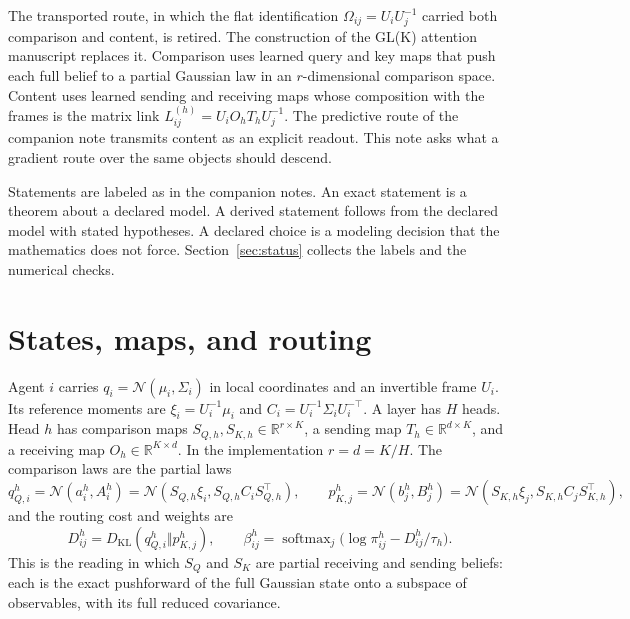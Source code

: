 \documentclass[11pt]{article}
\theoremstyle{definition}
\theoremstyle{remark}
\newcommand{\KL}{D_{\mathrm{KL}}}
\newcommand{\softmax}{\operatorname{softmax}}
\newcommand{\N}{\mathcal{N}}
\begin{document}
The transported route, in which the flat identification $\Omega_{ij}=U_iU_j^{-1}$ carried both comparison and content, is retired. The construction of the GL(K) attention manuscript \citep{dennis2026glk} replaces it. Comparison uses learned query and key maps that push each full belief to a partial Gaussian law in an $r$-dimensional comparison space. Content uses learned sending and receiving maps whose composition with the frames is the matrix link $L_{ij}^{(h)}=U_iO_hT_hU_j^{-1}$. The predictive route of the companion note \citep{dennis2026predictive} transmits content as an explicit readout. This note asks what a gradient route over the same objects should descend.

Statements are labeled as in the companion notes. An exact statement is a theorem about a declared model. A derived statement follows from the declared model with stated hypotheses. A declared choice is a modeling decision that the mathematics does not force. Section~\ref{sec:status} collects the labels and the numerical checks.

\section{States, maps, and routing}
\label{sec:setup}

Agent $i$ carries $q_i=\N(\mu_i,\Sigma_i)$ in local coordinates and an invertible frame $U_i$. Its reference moments are $\xi_i=U_i^{-1}\mu_i$ and $C_i=U_i^{-1}\Sigma_iU_i^{-\top}$. A layer has $H$ heads. Head $h$ has comparison maps $S_{Q,h},S_{K,h}\in\mathbb R^{r\times K}$, a sending map $T_h\in\mathbb R^{d\times K}$, and a receiving map $O_h\in\mathbb R^{K\times d}$. In the implementation $r=d=K/H$. The comparison laws are the partial laws
\begin{equation}
q_{Q,i}^{h}=\N(a_i^h,A_i^h)=\N(S_{Q,h}\xi_i,S_{Q,h}C_iS_{Q,h}^\top),\qquad
p_{K,j}^{h}=\N(b_j^h,B_j^h)=\N(S_{K,h}\xi_j,S_{K,h}C_jS_{K,h}^\top),
\label{eq:partial_laws}
\end{equation}
and the routing cost and weights are
\begin{equation}
D_{ij}^h=\KL(q_{Q,i}^h\Vert p_{K,j}^h),\qquad
\beta_{ij}^h=\softmax_j\bigl(\log\pi_{ij}^h-D_{ij}^h/\tau_h\bigr).
\label{eq:routing}
\end{equation}
This is the reading in which $S_Q$ and $S_K$ are partial receiving and sending beliefs: each is the exact pushforward of the full Gaussian state onto a subspace of observables, with its full reduced covariance.
\end{document}
